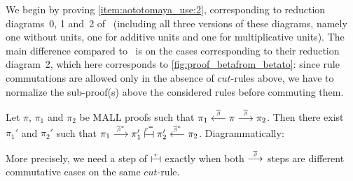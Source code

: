 \documentclass{lmcs}
\newenvironment{myscope}{
\begin{scope}[every node/.style={circle,thick,draw,minimum size=8mm,inner sep=0}, every edge/.style={->,draw=black,thick}, every path/.style={-,draw=black,thick}]
}{
\end{scope}
}
\newenvironment{myscopec}[1]{
\begin{scope}[every node/.style={circle,thick,draw=#1,minimum size=8mm,inner sep=0}, every edge/.style={->,draw=#1,thick}, every path/.style={draw=#1, thick}]
\color{#1}
}{
\end{scope}
}
\newcommand{\edgelabel}[1]{edge node[draw=none, sloped, align=center]{#1 \\}}
\newcommand{\symboltext}[2]{\mathrel{\overset{\makebox[0pt]{\mbox{\normalfont\tiny\sffamily \ensuremath{#1}}}}{#2}}} %
\newcommand{\betabar}{\overline{\beta}}
\newcommand{\betabarto}{\symboltext{\betabar}{\longrightarrow}}
\newcommand{\betabarfrom}{\symboltext{\betabar}{\longleftarrow}}
\newcommand{\betabartostar}{\symboltext{\betabar^*}{\longrightarrow}}
\newcommand{\betabarfromstar}{\symboltext{\betabar^*}{\longleftarrow}}
\newcommand{\vdashv}{\mathrel{\lower .22ex \hbox{$\vdash\!\dashv$}}}
\DeclareRobustCommand{\astsymbol}[1]{\mathrel{\ooalign{{$\vdashv$}\crcr{$\stackrel{#1}{\hphantom{\vdashv}\vphantom{\to}}$}}}}
\newcommand{\eqcone}{\astsymbol{r}} %
\newcommand{\eqceq}{\astsymbol{r^=}} %
\begin{document}
We begin by proving \autoref{item:aototomaya_use:2}, corresponding to reduction diagrams~0, 1 and~2 of~\cite[Section~B.2.1]{calculusformall} (including all three versions of these diagrams, namely one without units, one for additive units and one for multiplicative units).
The main difference compared to~\cite{calculusformall} is on the cases corresponding to their reduction diagram~2, which here corresponds to \autoref{fig:proof_betafrom_betato}: since rule commutations are allowed only in the absence of $cut$-rules above, we have to normalize the sub-proof(s) above the considered rules before commuting them.

\begin{lem}
\label{lem:betafrom_betato}
Let $\pi$, $\pi_1$ and $\pi_2$ be MALL proofs such that $\pi_1\betabarfrom\pi\betabarto\pi_2$.
Then there exist $\pi_1'$ and $\pi_2'$ such that $\pi_1\betabartostar\pi_1'\eqceq\pi_2'\betabarfromstar\pi_2$.
Diagrammatically:
\begin{center}
\end{center}
More precisely, we need a step of $\eqcone$ exactly when both $\betabarto$ steps are different commutative cases on the same $cut$-rule.
\end{lem}
\end{document}
